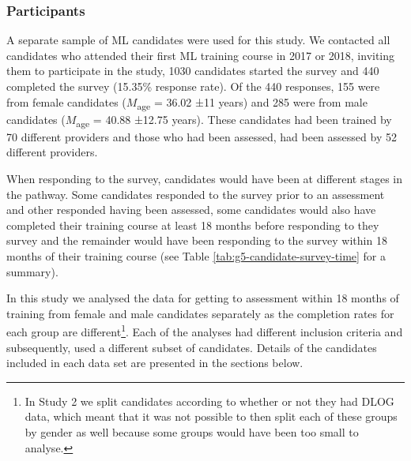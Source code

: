 \documentclass[a4paper,]{book}
\begin{document}
\hypertarget{participants-1}{%
\subsubsection{Participants}\label{participants-1}}

A separate sample of ML candidates were used for this study. We contacted all candidates who attended their first ML training course in 2017 or 2018, inviting them to participate in the study, 1030 candidates started the survey and 440 completed the survey (15.35\% response rate). Of the 440 responses, 155 were from female candidates (\(M\)\textsubscript{age} = 36.02 ±11 years) and 285 were from male candidates (\(M\)\textsubscript{age} = 40.88 ±12.75 years). These candidates had been trained by 70 different providers and those who had been assessed, had been assessed by 52 different providers.

When responding to the survey, candidates would have been at different stages in the pathway. Some candidates responded to the survey prior to an assessment and other responded having been assessed, some candidates would also have completed their training course at least 18 months before responding to they survey and the remainder would have been responding to the survey within 18 months of their training course (see Table \ref{tab:g5-candidate-survey-time} for a summary).

In this study we analysed the data for getting to assessment within 18 months of training from female and male candidates separately as the completion rates for each group are different\footnote{In Study 2 we split candidates according to whether or not they had DLOG data, which meant that it was not possible to then split each of these groups by gender as well because some groups would have been too small to analyse.}. Each of the analyses had different inclusion criteria and subsequently, used a different subset of candidates. Details of the candidates included in each data set are presented in the sections below.
\end{document}
